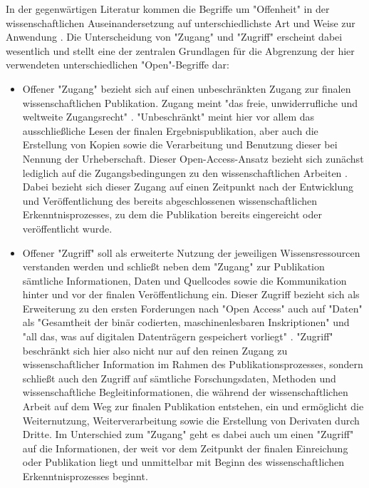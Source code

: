 In der gegenwärtigen Literatur kommen die Begriffe um "Offenheit" in der wissenschaftlichen Auseinandersetzung auf unterschiedlichste Art und Weise zur Anwendung \cite{Fecher_2013}. Die Unterscheidung von "Zugang" und "Zugriff" erscheint dabei wesentlich und stellt eine der zentralen Grundlagen für die Abgrenzung der hier verwendeten unterschiedlichen "Open"-Begriffe dar:
\begin{itemize}
\item Offener "Zugang" bezieht sich auf einen unbeschränkten Zugang zur finalen wissenschaftlichen Publikation. Zugang meint "das freie, unwiderrufliche und weltweite Zugangsrecht" \cite{Berliner_Erklaerung_2003}. "Unbeschränkt" meint hier vor allem das ausschließliche Lesen der finalen Ergebnispublikation, aber auch die Erstellung von Kopien sowie die Verarbeitung und Benutzung dieser \cite{Lossau_2007} bei Nennung der Urheberschaft. Dieser Open-Access-Ansatz bezieht sich zunächst lediglich auf die Zugangsbedingungen zu den wissenschaftlichen Arbeiten \cite{Mueller_2010}. Dabei bezieht sich dieser Zugang auf einen Zeitpunkt nach der Entwicklung und Veröffentlichung des bereits abgeschlossenen wissenschaftlichen Erkenntnisprozesses, zu dem die Publikation bereits eingereicht oder veröffentlicht wurde.
\item	Offener "Zugriff" soll als erweiterte Nutzung der jeweiligen Wissensressourcen verstanden werden und schließt neben dem "Zugang" zur Publikation sämtliche Informationen, Daten und Quellcodes sowie die Kommunikation hinter und vor der finalen Veröffentlichung \cite{Hey_2015} ein. Dieser Zugriff bezieht sich als Erweiterung zu den ersten Forderungen nach "Open Access" auch auf "Daten" als "Gesamtheit der binär codierten, maschinenlesbaren Inskriptionen" und "all das, was auf digitalen Datenträgern gespeichert vorliegt" \cite{Burkhardt_2015}. "Zugriff" beschränkt sich hier also nicht nur auf den reinen Zugang zu wissenschaftlicher Information im Rahmen des Publikationsprozesses, sondern schließt auch den Zugriff auf sämtliche Forschungsdaten, Methoden und wissenschaftliche Begleitinformationen, die während der wissenschaftlichen Arbeit auf dem Weg zur finalen Publikation entstehen, ein und ermöglicht die Weiternutzung, Weiterverarbeitung sowie die Erstellung von Derivaten durch Dritte. Im Unterschied zum "Zugang" geht es dabei auch um einen "Zugriff" auf die Informationen, der weit vor dem Zeitpunkt der finalen Einreichung oder Publikation liegt und unmittelbar mit Beginn des wissenschaftlichen Erkenntnisprozesses beginnt.
\end{itemize}

